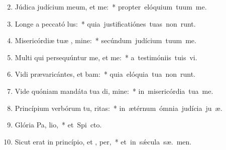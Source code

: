 \begin{flushleft}
\begin{enumerate}[leftmargin=*]
\setcounter{enumi}{1}

\item Júdica judícium meum, et  me:~* \mbox{propter elóquium tuum  me.}
\item Longe a peccató lus:~* \mbox{quia justificatiónes tuas non runt.}
\item Misericórdiæ tuæ , mine:~* \mbox{secúndum judícium tuum  me.}
\item Multi qui persequúntur me, et  me:~* \mbox{a testimóniis tuis  vi.}
\item Vidi prævaricántes, et bam:~* \mbox{quia elóquia tua non runt.}
\item Vide quóniam mandáta tua di, mine:~* \mbox{in misericórdia tua  me.}
\item Princípium verbórum tu, ritas:~* \mbox{in ætérnum ómnia judícia ju æ.}
\item Glória Pa,  lio,~* \mbox{et Spi cto.}
\item Sicut erat in princípio, et ,  per,~* \mbox{et in s\'{\ae}cula sæ. men.}


\end{enumerate}
\end{flushleft}

